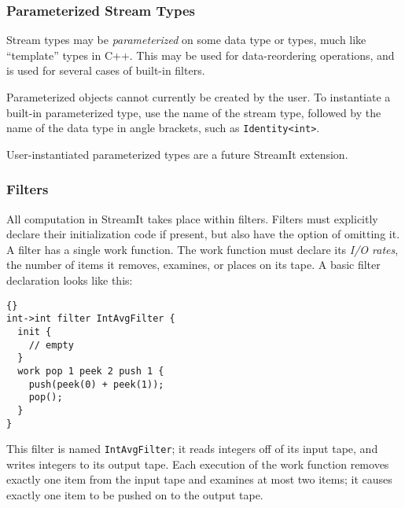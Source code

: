 \documentclass[11pt]{article}
\begin{document}
\subsubsection{Parameterized Stream Types}

Stream types may be \emph{parameterized} on some data type or types,
much like ``template'' types in C++.  This may be used for
data-reordering operations, and is used for several cases of built-in
filters.

Parameterized objects cannot currently be created by the user.  To
instantiate a built-in parameterized type, use the name of the stream
type, followed by the name of the data type in angle brackets, such as
\lstinline|Identity<int>|.

\begin{note}
User-instantiated parameterized types are a future StreamIt
extension.
\end{note}

\subsubsection{Filters}

All computation in StreamIt takes place within filters.  Filters must
explicitly declare their initialization code if present, but also have
the option of omitting it.  A filter has a single work function.
The work
function must declare its \emph{I/O rates}, the number of items 
it removes, examines, or places on its tape.  A basic filter
declaration looks like this:

\begin{lstlisting}{}
int->int filter IntAvgFilter {
  init {
    // empty
  }
  work pop 1 peek 2 push 1 {
    push(peek(0) + peek(1));
    pop();
  }
}
\end{lstlisting}

This filter is named \lstinline|IntAvgFilter|; it reads integers off of its
input tape, and writes integers to its output tape.  Each execution of
the work function removes exactly one item from the input tape and
examines at most two items; it causes exactly one item to be pushed on
to the output tape.

\end{document}
